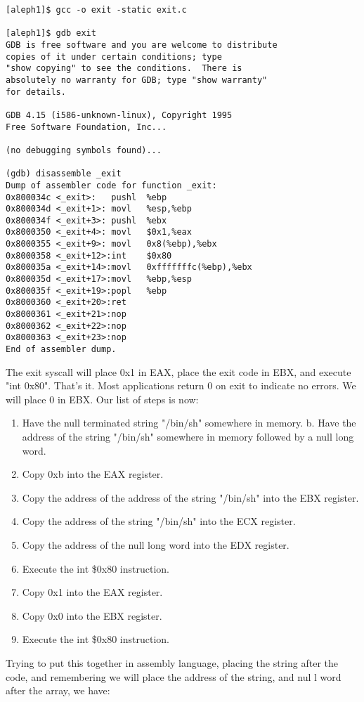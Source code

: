 \documentclass[10pt]{article}
\begin{document}
{{\small
\begin{verbatim}
[aleph1]$ gcc -o exit -static exit.c

[aleph1]$ gdb exit
GDB is free software and you are welcome to distribute 
copies of it under certain conditions; type 
"show copying" to see the conditions.  There is 
absolutely no warranty for GDB; type "show warranty" 
for details.

GDB 4.15 (i586-unknown-linux), Copyright 1995 
Free Software Foundation, Inc...

(no debugging symbols found)...

(gdb) disassemble _exit
Dump of assembler code for function _exit:
0x800034c <_exit>:   pushl  %ebp
0x800034d <_exit+1>: movl   %esp,%ebp
0x800034f <_exit+3>: pushl  %ebx
0x8000350 <_exit+4>: movl   $0x1,%eax
0x8000355 <_exit+9>: movl   0x8(%ebp),%ebx
0x8000358 <_exit+12>:int    $0x80
0x800035a <_exit+14>:movl   0xfffffffc(%ebp),%ebx
0x800035d <_exit+17>:movl   %ebp,%esp
0x800035f <_exit+19>:popl   %ebp
0x8000360 <_exit+20>:ret
0x8000361 <_exit+21>:nop
0x8000362 <_exit+22>:nop
0x8000363 <_exit+23>:nop
End of assembler dump.
\end{verbatim}
}
The exit syscall will place 0x1 in EAX, place the exit code in EBX, and execute "int 0x80". That's it. Most 
applications return 0 on exit to indicate no errors. We will place 0 in EBX.  Our list of steps is now: 

\begin{enumerate}
\item Have the null terminated string "/bin/sh" somewhere in memory. b. Have the address of the string "/bin/sh" somewhere in memory followed by a null long word. 
\item Copy 0xb into the EAX register. 
\item Copy the address of the address of the string "/bin/sh" into the EBX register. 
\item Copy the address of the string "/bin/sh" into the ECX register. 
\item Copy the address of the null long word into the EDX register. 
\item Execute the int \$0x80 instruction. 
\item Copy 0x1 into the EAX register. 
\item Copy 0x0 into the EBX register. 
\item Execute the int \$0x80 instruction. 
\end{enumerate}

Trying to put this together in assembly language, placing the string after the code, and remembering we will 
place the address of the string, and nul l word after the array, we have:

}
\end{document}
